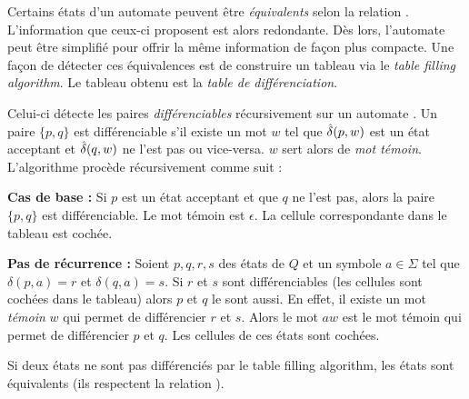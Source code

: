Certains états d'un automate peuvent être \emph{équivalents} selon la relation \rf. L'information que ceux-ci proposent est alors redondante. Dès lors, l'automate peut être simplifié pour offrir la même information de façon plus compacte. Une façon de détecter ces équivalences est de construire un tableau via le \emph{table filling algorithm}. Le tableau obtenu est la \emph{table de différenciation}.

Celui-ci détecte les paires \emph{différenciables} récursivement sur un automate \automaton. Un paire $\{p,q\}$ est différenciable s'il existe un mot $w$ tel que $\hat{\delta}(p,w)$ est un état acceptant et $\hat{\delta}(q,w)$ ne l'est pas ou vice-versa. $w$ sert alors de \emph{mot témoin}. L'algorithme procède récursivement comme suit :

\textbf{Cas de base :} Si $p$ est un état acceptant et que $q$ ne l'est pas, alors la paire $\{p,q\}$ est différenciable. Le mot témoin est $\epsilon$. La cellule correspondante dans le tableau est cochée.

\textbf{Pas de récurrence : } Soient $p,q,r,s$ des états de $Q$ et un symbole $a \in \Sigma$ tel que $\delta(p,a)=r$ et $\delta(q,a)=s$. Si $r$ et $s$ sont différenciables (les cellules sont cochées dans le tableau) alors $p$ et $q$ le sont aussi. En effet, il existe un mot \emph{témoin} $w$ qui permet de différencier $r$ et $s$. Alors le mot $aw$ est le mot témoin qui permet de différencier $p$ et $q$. Les cellules de ces états sont cochées.

\begin{theorem}
 Si deux états ne sont pas différenciés par le table filling algorithm, les états sont équivalents (ils respectent la relation \rf).
\end{theorem}


